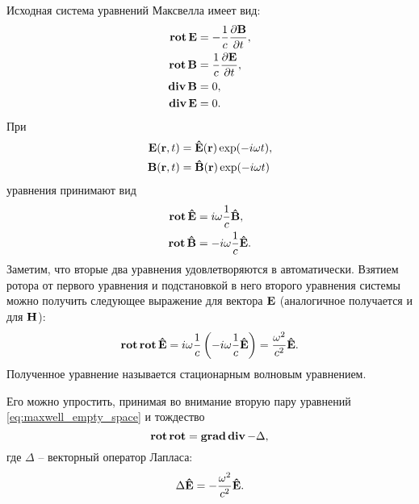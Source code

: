 \documentclass[12pt,a4paper]{article}
\begin{document}
        Исходная система уравнений Максвелла имеет вид:
        \begin{equation}\begin{aligned}\label{eq:maxwell_empty_space}
            \operatorname{\mathbf{rot}}\mathbf{E} &= - \frac{1}{c} \frac{\partial \mathbf{B}}{\partial t}, \\
            \operatorname{\mathbf{rot}}\mathbf{B} &= \frac{1}{c} \frac{\partial \mathbf{E}}{\partial t}, \\
            \operatorname{\mathbf{div}}\mathbf{B} &= 0, \\
            \operatorname{\mathbf{div}}\mathbf{E} &= 0.
        \end{aligned}\end{equation}
        При
        \begin{equation}\begin{aligned}
            \mathbf{E}(\mathbf{r}, t) &= \mathbf{\hat{E}}(\mathbf{r}) \exp(- i \omega t), \\
            \mathbf{B}(\mathbf{r}, t) &= \mathbf{\hat{B}}(\mathbf{r}) \exp(- i \omega t)
        \end{aligned}\end{equation}
        уравнения принимают вид
        \begin{equation}\begin{aligned}
            \operatorname{\mathbf{rot}}\mathbf{\hat{E}} &= i \omega \frac{1}{c} \mathbf{\hat{B}}, \\
            \operatorname{\mathbf{rot}}\mathbf{\hat{B}} &= - i \omega \frac{1}{c} \mathbf{\hat{E}}.
        \end{aligned}\end{equation}
        Заметим, что вторые два уравнения удовлетворяются в автоматически. Взятием ротора от первого уравнения и подстановкой в него второго уравнения системы можно получить следующее выражение для вектора $\mathbf{E}$ (аналогичное получается и для $\mathbf{H}$):
        \begin{equation}
            \operatorname{\mathbf{rot}}\operatorname{\mathbf{rot}}{\mathbf{\hat{E}}} = i \omega \frac{1}{c} \left( -i \omega \frac{1}{c} \mathbf{\hat{E}} \right) = \frac{\omega^2}{c^2} \mathbf{\hat{E}}.
        \end{equation}
        Полученное уравнение называется стационарным волновым уравнением.

        Его можно упростить, принимая во внимание вторую пару уравнений \autoref{eq:maxwell_empty_space} и тождество
        \begin{equation}\label{eq:laplacian_vect}
            \operatorname{\mathbf{rot}}\operatorname{\mathbf{rot}} = \operatorname{\mathbf{grad}}\operatorname{\mathbf{div}} - \Delta,
        \end{equation}
        где $\Delta$ -- векторный оператор Лапласа:
        \begin{equation}
            \Delta\mathbf{\hat{E}} = - \frac{\omega^2}{c^2} \mathbf{\hat{E}}.
        \end{equation}
\end{document}

